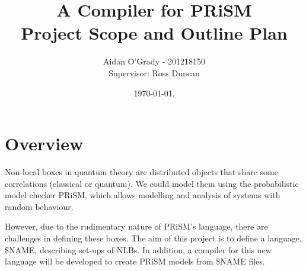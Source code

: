 \documentclass[11pt, a4paper]{article}
\begin{document}
\title{A Compiler for PRiSM \\
\large{Project Scope and Outline Plan}}
\author{Aidan O'Grady - 201218150\\Supervisor: Ross Duncan}
\date{\today, \currenttime}
\maketitle

\section{Overview} %
\label{sec:overview}
Non-local boxes in quantum theory are distributed objects that share some
correlations (classical or quantum). We could model them using the probabilistic
model checker PRiSM, which allows modelling and analysis of systems with random
behaviour.

However, due to the rudimentary nature of PRiSM's language, there are
challenges in defining these boxes. The aim of this project is to define a
language, \$NAME, describing set-ups of NLBs. In addition, a compiler for this
new language will be developed to create PRiSM models from \$NAME files.

\end{document}
